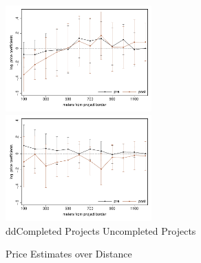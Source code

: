 \documentclass[aspectratio=149]{beamer}
\begin{document}
\begin{frame}
\begin{figure}
\caption{Price Estimates over Distance}\label{figure:distplot}
\includegraphics[width=0.5\textwidth,trim={.77cm 0cm .21cm 0cm}]{distplot.pdf}
\includegraphics[width=0.5\textwidth,trim={.77cm 0cm .21cm 0cm},clip]{distplot_placebo.pdf}\\
{\color{white}dd}Completed Projects \hspace{4.2cm} Uncompleted Projects
\end{figure}

\end{frame}
\end{document}
